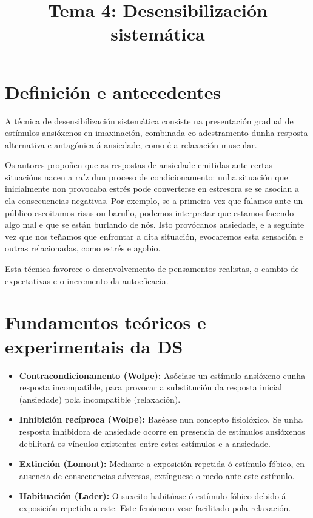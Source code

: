 \documentclass[a4paper,11pt]{article}
\title{Tema 4: Desensibilización sistemática}
\date{}
\begin{document}
   

\maketitle 

\section{Definición e antecedentes}
A técnica de desensibilización sistemática consiste na presentación gradual de estímulos ansióxenos en imaxinación, combinada co adestramento dunha resposta alternativa e antagónica á ansiedade, como é a relaxación muscular. 

Os autores propoñen que as respostas de ansiedade emitidas ante certas situacións nacen a raíz dun proceso de condicionamento: unha situación que inicialmente non provocaba estrés pode converterse en estresora se se asocian a ela consecuencias negativas. Por exemplo, se a primeira vez que falamos ante un público escoitamos risas ou barullo, podemos interpretar que estamos facendo algo mal e que se están burlando de nós. Isto provócanos ansiedade, e a seguinte vez que nos teñamos que enfrontar a dita situación, evocaremos esta sensación e outras relacionadas, como estrés e agobio.

Esta técnica favorece o desenvolvemento de pensamentos realistas, o cambio de expectativas e o incremento da autoeficacia. 

\section{Fundamentos teóricos e experimentais da DS}
\begin{itemize}
	\item \textbf{Contracondicionamento (Wolpe):} Asóciase un estímulo ansióxeno cunha resposta 
	incompatible, para provocar a substitución da resposta inicial (ansiedade) pola incompatible 
	(relaxación).
	\item \textbf{Inhibición recíproca (Wolpe):} Baséase nun concepto fisiolóxico. Se unha resposta 
	inhibidora de ansiedade ocorre en presencia de estímulos ansióxenos debilitará os vínculos 
	existentes entre estes estímulos e a ansiedade.
	\item \textbf{Extinción (Lomont):} Mediante a exposición repetida ó estímulo fóbico, en ausencia 
	de consecuencias adversas, extínguese o medo ante este estímulo.
	\item \textbf{Habituación (Lader):} O suxeito habitúase ó estímulo fóbico debido á exposición 
	repetida a este. Este fenómeno vese facilitado pola relaxación.
\end{itemize}
\end{document}
